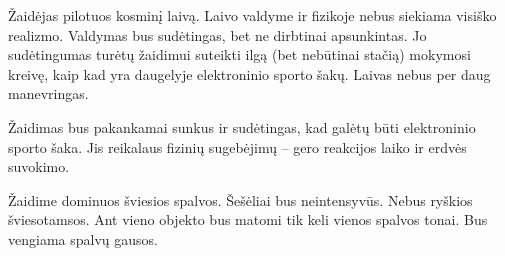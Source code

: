 Žaidėjas pilotuos kosminį laivą.
Laivo valdyme ir fizikoje nebus siekiama visiško realizmo.
Valdymas bus sudėtingas, bet ne dirbtinai apsunkintas.
Jo sudėtingumas turėtų žaidimui suteikti ilgą (bet nebūtinai stačią) mokymosi kreivę, kaip kad yra daugelyje elektroninio sporto šakų.
Laivas nebus per daug manevringas.

Žaidimas bus pakankamai sunkus ir sudėtingas, kad galėtų būti elektroninio sporto šaka.
Jis reikalaus fizinių sugebėjimų -- gero reakcijos laiko ir erdvės suvokimo.

Žaidime dominuos šviesios spalvos.
Šešėliai bus neintensyvūs.
Nebus ryškios šviesotamsos.
Ant vieno objekto bus matomi tik keli vienos spalvos tonai.
Bus vengiama spalvų gausos.
